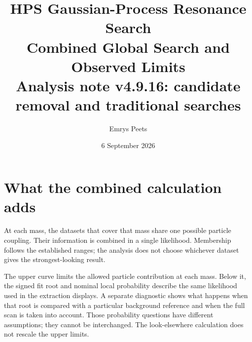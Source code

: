 \documentclass[11pt]{article}
\title{HPS Gaussian-Process Resonance Search\\Combined Global Search and Observed Limits\\\large Analysis note v4.9.16: candidate removal and traditional searches}
\author{Emrys Peets}
\date{6 September 2026}
\begin{document}
\maketitle
\begin{center}\end{center}

\section{What the combined calculation adds}
At each mass, the datasets that cover that mass share one possible particle coupling. Their information is combined in a single likelihood. Membership follows the established ranges; the analysis does not choose whichever dataset gives the strongest-looking result.

The upper curve limits the allowed particle contribution at each mass. Below it, the signed fit root and nominal local probability describe the same likelihood used in the extraction displays. A separate diagnostic shows what happens when that root is compared with a particular background reference and when the full scan is taken into account. Those probability questions have different assumptions; they cannot be interchanged. The look-elsewhere calculation does not rescale the upper limits.



\clearpage
\end{document}
